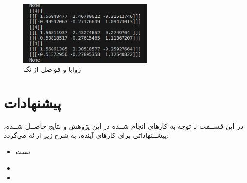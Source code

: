 \begin{figure}[H]
	\centering
	\includegraphics[width=0.6\textwidth]{./images/Chapter5/arucoMatrices}	
	\caption[ زوایا و فواصل از تگ]{زوایا و فواصل از تگ}
	\label{مکان‌یابی}
\end{figure}
\noindent
\unskip

\section{پیشنهادات}
در اين قســمت با توجه به كارهای انجام شــده در اين پژوهش و نتايج حاصــل شــده، پيشــنهاداتی برای كارهای آينده، به شرح زير ارائه مي‌گردد:
\begin{itemize}
	\item
	تست
	\item
	
	\item
	
\end{itemize}